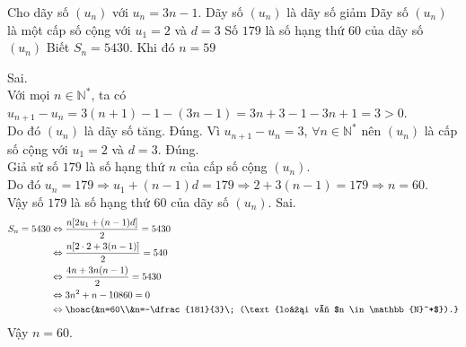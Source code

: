 \begin{ex}%
Cho dãy số $(u_n)$ với $u_n=3n-1$.
	\choiceTF
	{Dãy số $(u_n)$ là dãy số giảm}
	{\True Dãy số $(u_n)$ là một cấp số cộng với $u_1=2$ và $d=3$}
	{\True Số $179$ là số hạng thứ $60$ của dãy số $(u_n)$}
	{Biết $S_n=5430$. Khi đó $n=59$}
	\loigiai
	{
		\begin{itemchoice}
			\itemch Sai.\\ Với mọi $n \in \mathbb{N}^*$, ta có\\ $u_{n+1}-u_n=3(n+1)-1-(3n-1)=3n+3-1-3n+1=3>0$.\\
			Do đó $(u_n)$ là dãy số tăng.
			\itemch Đúng. Vì $u_{n+1}-u_n=3$, $\forall n \in \mathbb{N}^*$ nên $(u_n)$ là cấp số cộng với $u_1=2$ và $d=3$.
			\itemch Đúng. \\
			Giả sử số $179$ là số hạng thứ $n$ của cấp số cộng $(u_n)$.\\
			Do đó $u_n = 179 \Rightarrow u_1+(n-1)d=179 \Rightarrow 2+3(n-1)=179 \Rightarrow n=60$.\\
			Vậy số $179$ là số hạng thứ $60$ của dãy số $(u_n)$.
			\itemch Sai. \begin{align*}
				S_n=5430&\Leftrightarrow \dfrac{n[2u_1+(n-1)d]}{2} = 5430\\
				&\Leftrightarrow \dfrac{n[2 \cdot 2 +3(n-1)]}{2}=540\\
				&\Leftrightarrow \dfrac{4n+3n(n-1)}{2}=5430\\
				&\Leftrightarrow 3n^2+n-10860=0\\
				&\Leftrightarrow \hoac{&n=60\\&n=-\dfrac{181}{3}\; (\text{loại vì $n \in \mathbb{N}^*$}).}
			\end{align*}
			Vậy $n=60$.
		\end{itemchoice}
	}
\end{ex}
